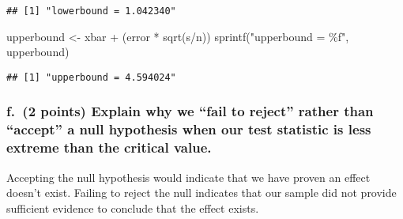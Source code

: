 \documentclass[
]{article}
\newenvironment{Shaded}{\begin{snugshade}}{\end{snugshade}}
\newcommand{\FunctionTok}[1]{\textcolor[rgb]{0.00,0.00,0.00}{#1}}
\newcommand{\NormalTok}[1]{#1}
\newcommand{\OtherTok}[1]{\textcolor[rgb]{0.56,0.35,0.01}{#1}}
\newcommand{\SpecialCharTok}[1]{\textcolor[rgb]{0.00,0.00,0.00}{#1}}
\newcommand{\StringTok}[1]{\textcolor[rgb]{0.31,0.60,0.02}{#1}}
\begin{document}
\begin{verbatim}
## [1] "lowerbound = 1.042340"
\end{verbatim}

\begin{Shaded}
\begin{Highlighting}[]
\NormalTok{upperbound }\OtherTok{\textless{}{-}}\NormalTok{ xbar }\SpecialCharTok{+}\NormalTok{ (error }\SpecialCharTok{*} \FunctionTok{sqrt}\NormalTok{(s}\SpecialCharTok{/}\NormalTok{n))}
\FunctionTok{sprintf}\NormalTok{(}\StringTok{"upperbound = \%f"}\NormalTok{, upperbound)}
\end{Highlighting}
\end{Shaded}

\begin{verbatim}
## [1] "upperbound = 4.594024"
\end{verbatim}

\hypertarget{f.-2-points-explain-why-we-fail-to-reject-rather-than-accept-a-null-hypothesis-when-our-test-statistic-is-less-extreme-than-the-critical-value.}{%
\subsubsection{f.~(2 points) Explain why we ``fail to reject'' rather
than ``accept'' a null hypothesis when our test statistic is less
extreme than the critical
value.}\label{f.-2-points-explain-why-we-fail-to-reject-rather-than-accept-a-null-hypothesis-when-our-test-statistic-is-less-extreme-than-the-critical-value.}}

Accepting the null hypothesis would indicate that we have proven an
effect doesn't exist. Failing to reject the null indicates that our
sample did not provide sufficient evidence to conclude that the effect
exists.
\end{document}
